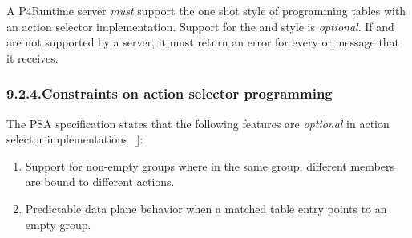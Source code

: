 \documentclass[11pt]{article}
\begin{document}
{%
A P4Runtime server \emph{must} support the one shot style of programming tables with
an action selector implementation. Support for the  and
 style is \emph{optional}.  If  and
 are not supported by a server, it must return an
 error for every  or 
message that it receives.%

\subsubsection{9.2.4.\hspace*{0.5em}Constraints on action selector programming}\label{sec-constraints-on-action-selector-programming}%

\noindent{}The PSA specification states that the following features are \emph{optional} in
action selector implementations~[]:%

\begin{enumerate}[noitemsep,topsep=\mdcompacttopsep]%

\item{}Support for non-empty groups where in the same group, different members are
bound to different actions.%

\item{}Predictable data plane behavior when a matched table entry points to an empty
group.%
\end{enumerate}%

}
\end{document}
